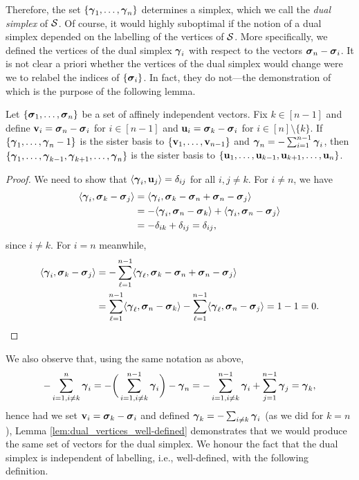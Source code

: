 Therefore, the set $\{\vb*{\gamma}_1,\dots,\vb*{\gamma}_n\}$ determines a simplex, which we call the \emph{dual simplex} of $\mathcal{S}$. Of course, it would highly suboptimal if the notion of a dual simplex depended on the labelling of the vertices of $\mathcal{S}$. More specifically, we defined the vertices of the dual simplex $\vb*{\gamma}_i$ with respect to the vectors $\vb*{\sigma}_n-\vb*{\sigma}_i$. It is not clear a priori whether the vertices of the dual simplex would change were we to relabel the indices of $\{\vb*{\sigma}_i\}$. In fact, they do not---the demonstration of which is the purpose of the following lemma. 

\begin{lemma}
	\label{lem:dual_vertices_well-defined}
	Let $\{\vb*{\sigma}_1,\dots,\vb*{\sigma}_n\}$ be a set of affinely independent vectors. Fix $k\in [n-1]$ and define $\vb{v}_i=\vb*{\sigma}_n-\vb*{\sigma}_i$ for $i\in[n-1]$ and $\vb{u}_i=\vb*{\sigma}_k-\vb*{\sigma}_i$  for $i\in[n]\setminus\{k\}$. If $\{\vb*{\gamma}_1,\dots,\vb*{\gamma}_n-1\}$ is the sister basis to $\{\vb{v}_1,\dots,\vb{v}_{n-1}\}$ and $\vb*{\gamma}_n = -\sum_{i=1}^{n-1}\vb*{\gamma}_i$, then $\{\vb*{\gamma}_1,\dots,\vb*{\gamma}_{k-1},\vb*{\gamma}_{k+1},\dots,\vb*{\gamma}_{n}\}$ is the sister basis to $\{\vb{u}_1,\dots,\vb{u}_{k-1},\vb{u}_{k+1},\dots,\vb{u}_n\}$. 
\end{lemma}
\begin{proof}
	We need to show that $\langle \vb*{\gamma}_i,\vb{u}_j\rangle = \delta_{ij}$ for all $i,j\neq k$. For $i\neq n$, we have 
	\begin{align*}
	\langle \vb*{\gamma}_i, \vb*{\sigma}_k-\vb*{\sigma}_j\rangle &= \langle \vb*{\gamma}_i,\vb*{\sigma}_k-\vb*{\sigma}_n+\vb*{\sigma}_n-\vb*{\sigma}_j\rangle \\
	&= -\langle \vb*{\gamma}_i,\vb*{\sigma}_n-\vb*{\sigma}_k \rangle + \langle \vb*{\gamma}_i,\vb*{\sigma}_n-\vb*{\sigma}_j\rangle \\
	&= -\delta_{ik} + \delta_{ij} = \delta_{ij},
	\end{align*}
	since $i\neq k$. For $i=n$ meanwhile, 
	\begin{align*}
	\langle \vb*{\gamma}_i,\vb*{\sigma}_k-\vb*{\sigma}_j\rangle &= -\sum_{\ell=1}^{n-1}\langle \vb*{\gamma}_\ell,\vb*{\sigma}_k-\vb*{\sigma}_n+\vb*{\sigma}_n-\vb*{\sigma}_j\rangle \\
	&= \sum_{\ell=1}^{n-1}\langle \vb*{\gamma}_\ell,\vb*{\sigma}_n-\vb*{\sigma}_k\rangle - \sum_{\ell=1}^{n-1}\langle  \vb*{\gamma}_\ell,\vb*{\sigma}_n-\vb*{\sigma}_j\rangle =1-1=0. \qedhere
	\end{align*}
\end{proof}

We also observe that, using the same notation as above, 
\[-\sum_{i=1,i\neq k}^n \vb*{\gamma}_i = -\bigg(\sum_{i=1,i\neq k}^{n-1} \vb*{\gamma}_i\bigg) - \vb*{\gamma}_n = -\sum_{i=1,i\neq k}^{n-1}\vb*{\gamma}_i + \sum_{j=1}^{n-1} \vb*{\gamma}_j = \vb*{\gamma}_k,\]
hence had we set $\vb{v}_i=\vb*{\sigma}_k-\vb*{\sigma}_i$ and defined $\vb*{\gamma}_k = -\sum_{i\neq k}\vb*{\gamma}_i$ (as we did for $k=n$), Lemma \ref{lem:dual_vertices_well-defined} demonstrates that we would produce the same set of vectors for the dual simplex. We honour the fact that the dual simplex is independent of labelling, i.e., well-defined, with the following definition. 

